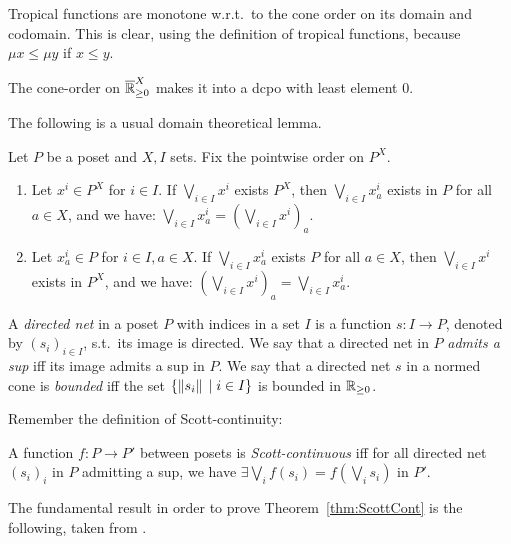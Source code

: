 \begin{remark}\label{rmk:tropMonot}
 Tropical functions are monotone w.r.t.\ to the cone order on its domain and codomain.
 This is clear, using the definition of tropical functions, because $\mu x\leq \mu y$ if $x\leq y$.
\end{remark}

\begin{remark}
 The cone-order on $\overline{\mathbb{R}}_{\geq 0}^X$ makes it into a dcpo with least element $0$.
\end{remark}

The following is a usual domain theoretical lemma.

\begin{lemma}\label{lm:sup=sup}
 Let $P$ be a poset and $X, I$ sets. Fix the pointwise order on $P^X$.
 \begin{enumerate}
  \item Let $x^i\in P^X$ for $i\in I$.
  If $\bigvee\limits_{i\in I} x^i$ exists $P^X$, then $\bigvee\limits_{i\in I} x^i_a$ exists in $P$ for all $a\in X$, and we have: $\bigvee\limits_{i\in I} x^i_a=\left(\bigvee\limits_{i\in I} x^i\right)_a$.
 \item Let $x^i_a\in P$ for $i\in I,a\in X$.
  If $\bigvee\limits_{i\in I} x^i_a$ exists $P$ for all $a\in X$, then $\bigvee\limits_{i\in I} x^i$ exists in $P^X$, and we have: $\left(\bigvee\limits_{i\in I} x^i\right)_a=\bigvee\limits_{i\in I} x^i_a$.
 \end{enumerate}
\end{lemma}

A \emph{directed net} in a poset $P$ with indices in a set $I$ is a function $s:I\to P$, denoted by $(s_i)_{i\in I}$, s.t.\ its image is directed.
We say that a directed net in $P$ \emph{admits a sup} iff its image admits a sup in $P$.
We say that a directed net $s$ in a normed cone is \emph{bounded} iff the set $\{\lVert s_i\rVert\,\mid i\in I\}$ is bounded in $\mathbb{R}_{\geq 0}$.

Remember the definition of Scott-continuity:

\begin{definition}
 A function $f:P\to P'$ between posets is \emph{Scott-continuous} iff for all directed net $(s_i)_i$ in $P$ admitting a sup, we have $\exists \bigvee\limits_i f(s_i) = f(\bigvee\limits_i s_i)$ in $P'$. 
\end{definition}

The fundamental result in order to prove Theorem~\ref{thm:ScottCont} is the following, taken from \cite{Selinger2004}.

